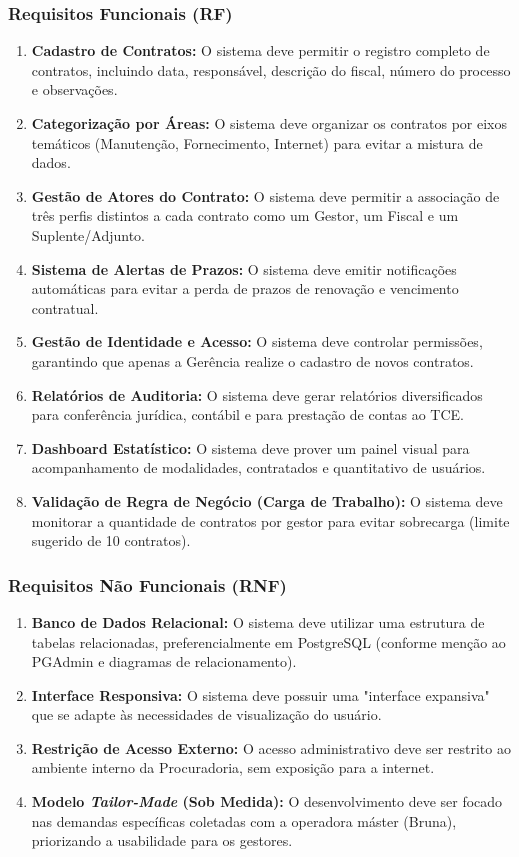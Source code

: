 \documentclass[12pt,a4paper]{article}
\begin{document}
\subsubsection*{Requisitos Funcionais (RF)}
    \begin{enumerate}
        \item \textbf{Cadastro de Contratos:} O sistema deve permitir o registro completo de contratos, incluindo data, responsável, descrição do fiscal, número do processo e observações.
        \item \textbf{Categorização por Áreas:} O sistema deve organizar os contratos por eixos temáticos (Manutenção, Fornecimento, Internet) para evitar a mistura de dados.
        \item \textbf{Gestão de Atores do Contrato:} O sistema deve permitir a associação de três perfis distintos a cada contrato como um Gestor, um Fiscal e um Suplente/Adjunto.
        \item \textbf{Sistema de Alertas de Prazos:} O sistema deve emitir notificações automáticas para evitar a perda de prazos de renovação e vencimento contratual.
        \item \textbf{Gestão de Identidade e Acesso:} O sistema deve controlar permissões, garantindo que apenas a Gerência realize o cadastro de novos contratos.
        \item \textbf{Relatórios de Auditoria:} O sistema deve gerar relatórios diversificados para conferência jurídica, contábil e para prestação de contas ao TCE.
        \item \textbf{Dashboard Estatístico:} O sistema deve prover um painel visual para acompanhamento de modalidades, contratados e quantitativo de usuários.
        \item \textbf{Validação de Regra de Negócio (Carga de Trabalho):} O sistema deve monitorar a quantidade de contratos por gestor para evitar sobrecarga (limite sugerido de 10 contratos).
    \end{enumerate}
\subsubsection*{Requisitos Não Funcionais (RNF)}
    \begin{enumerate}
        \item \textbf{Banco de Dados Relacional:} O sistema deve utilizar uma estrutura de tabelas relacionadas, preferencialmente em PostgreSQL (conforme menção ao PGAdmin e diagramas de relacionamento).
        \item \textbf{Interface Responsiva:} O sistema deve possuir uma "interface expansiva" que se adapte às necessidades de visualização do usuário.
        \item \textbf{Restrição de Acesso Externo:} O acesso administrativo deve ser restrito ao ambiente interno da Procuradoria, sem exposição para a internet.
        \item \textbf{Modelo \textit{Tailor-Made} (Sob Medida):} O desenvolvimento deve ser focado nas demandas específicas coletadas com a operadora máster (Bruna), priorizando a usabilidade para os gestores.
    \end{enumerate}
\end{document}
